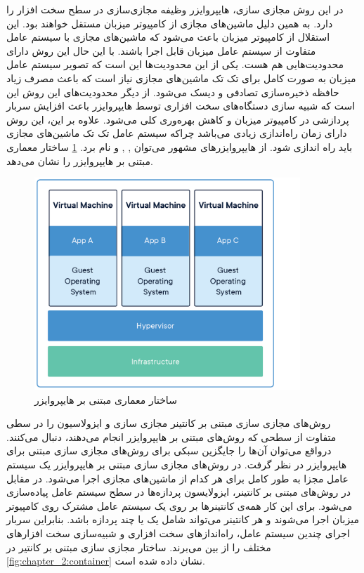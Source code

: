     در این روش مجازی سازی، هایپروایزر وظیفه مجازی‌سازی در سطح سخت افزار را دارد.
    به همین دلیل ماشین‌های مجازی از کامپیوتر میزبان مستقل خواهند بود.
    این استقلال از کامپیوتر میزبان باعث می‌شود که ماشین‌های مجازی با سیستم عامل متفاوت از سیستم عامل میزبان قابل اجرا باشند\cite{morabito2015hypervisors}.
    با این حال این روش دارای محدودیت‌هایی هم هست.
    یکی از این محدودیت‌ها این است که تصویر سیستم عامل میزبان به صورت کامل برای تک تک ماشین‌های مجازی نیاز است که باعث مصرف زیاد حافظه ذخیره‌سازی تصادفی و دیسک می‌شود.
    از دیگر محدودیت‌های این روش این است که شبیه سازی دستگاه‌های سخت افزاری توسط هایپروایزر باعث افزایش سربار پردازشی در کامپیوتر میزبان و کاهش بهره‌وری کلی می‌شود.
    علاوه بر این، این روش دارای زمان راه‌اندازی زیادی می‌باشد چراکه سیستم عامل تک تک ماشین‌های مجازی باید راه اندازی شود.
    از هایپروایزرهای مشهور می‌توان \cite{2019kvm}, \cite{2019esxi}, \cite{2019xen} و \cite{2019hyper} نام برد.
    \cref{fig:chapter_2:vm} ساختار معماری مبتنی بر هایپروایزر را نشان می‌دهد.

    \begin{figure}[]
      \centerline{\includegraphics[width=10cm]{graphics/chapter_2/vm}}
      \caption{ساختار معماری مبتنی بر هایپروایزر \cite{2018are}}
      \label{fig:chapter_2:vm}
    \end{figure}

    روش‌های مجازی سازی مبتنی بر کانتینر مجازی سازی و ایزولاسیون را در سطی متفاوت از سطحی که روش‌های مبتنی بر هایپروایزر انجام می‌دهند، دنبال می‌کنند.
    درواقع می‌توان آن‌ها را جایگزین سبکی برای روش‌های مجازی سازی مبتنی برای هایپروایزر در نظر گرفت.
    در روش‌های مجازی سازی مبتنی بر هایپروایزر یک سیستم عامل مجزا به طور کامل برای هر کدام از ماشین‌های مجازی اجرا می‌شود.
    در مقابل در روش‌های مبتنی بر کانتینر، ایزولایسون پردازه‌ها در سطح سیستم عامل پیاده‌سازی می‌شود.
    برای این کار همه‌ی کانتینر‌ها بر روی یک سیستم عامل مشترک روی کامپیوتر میزبان اجرا می‌شوند و هر کانتینر می‌تواند شامل یک یا چند پردازه باشد.
    بنابراین سربار اجرای چندین سیستم عامل، راه‌انداز‌های سخت افزاری و شبیه‌سازی سخت افزار‌های مختلف را از بین می‌برند.
    ساختار مجازی سازی مبتنی بر کانتیر در \cref{fig:chapter_2:container} نشان داده شده است.

